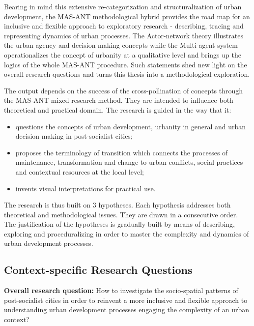 \documentclass[11pt]{report}
\begin{document}
Bearing in mind this extensive re-categorization and structuralization of urban development, the MAS-ANT methodological hybrid provides the road map for an inclusive and flexible approach to exploratory research - describing, tracing and representing dynamics of urban processes. The Actor-network theory illustrates the urban agency and decision making concepts while the Multi-agent system operationalizes the concept of urbanity at a qualitative level and brings up the logics of the whole MAS-ANT procedure. Such statements shed new light on the overall research questions and turns this thesis into a methodological exploration.

The output depends on the success of the cross-pollination of concepts through the MAS-ANT mixed research method. They are intended to influence both theoretical and practical domain. The research is guided in the way that it:
\begin{itemize}
\item questions the concepts of urban development, urbanity in general and urban decision making in post-socialist cities;
\item proposes the terminology of transition which connects the processes of maintenance, transformation and change to urban conflicts, social practices and contextual resources at the local level;
\item invents visual interpretations for practical use.
\end{itemize}

The research is thus built on 3 hypotheses. Each hypothesis addresses both theoretical and methodological issues. They are drawn in a consecutive order. The justification of the hypotheses is gradually built by means of describing, exploring and proceduralizing in order to master the complexity and dynamics of urban development processes. 

\subsection{Context-specific Research Questions}

\textbf{Overall research question:} How to investigate the socio-spatial patterns of post-socialist cities in order to reinvent a more inclusive and flexible approach to understanding urban development processes engaging the complexity of an urban context? 
\end{document}
